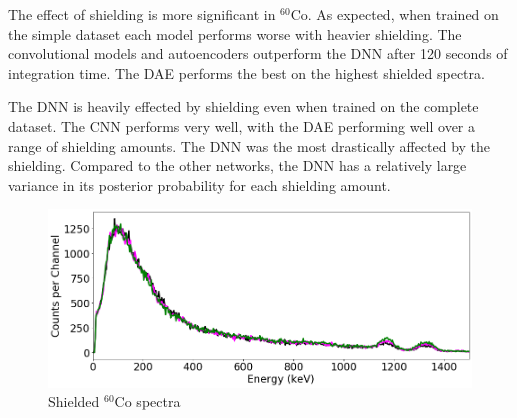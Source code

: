 The effect of shielding is more significant in $^{60}$Co. As expected, when trained on the simple dataset each model performs worse with heavier shielding. The convolutional models and autoencoders outperform the DNN after 120 seconds of integration time. The DAE performs the best on the highest shielded spectra.  

The DNN is heavily effected by shielding even when trained on the complete dataset. The CNN performs very well, with the DAE performing well over a range of shielding amounts. The DNN was the most drastically affected by the shielding. Compared to the other networks, the DNN has a relatively large variance in its posterior probability for each shielding amount.

\begin{figure}[H]
	\centering
	\includegraphics[width=1.0\linewidth]{images/shielded_co60}
	\caption{Shielded $^{60}$Co spectra}
	\label{fig:shielded_co60}
\end{figure}

